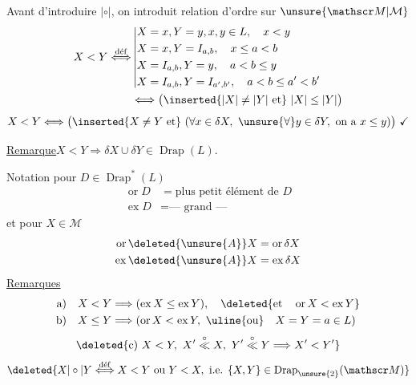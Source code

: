 
Avant d'introduire $|\circ|$, on introduit relation d'ordre sur $\unsure{\mathscr M|\mathcal M}$
\[
\begin{aligned}
X<Y\overset{\mathrm{d\acute ef}}{\Longleftrightarrow}
&\left\vert\begin{aligned}
&X=x,Y=y,x,y\in L,\quad x<y\\
&X=x,Y=I_{a,b},\quad x\leq a<b\\
&X=I_{a,b},Y=y,\quad a<b\leq y\\
&X=I_{a,b},Y=I_{a',b'},\quad a<b\leq a'<b'
\end{aligned}\right.\\
&\Longleftrightarrow\bigl(\inserted{|X|\ne|Y|\text{ et}}\ |X|\leq|Y|\bigr)
\end{aligned}
\]
\[
X<Y\Longleftrightarrow\bigl(\inserted{X\ne Y\text{ et}}\ (\forall x\in\delta X,\ \unsure{\forall}y\in\delta Y,\text{ on a }x\leq y)\bigr)\ \checkmark
\]

\uline{Remarque}\quad $X<Y\Longrightarrow\delta X\cup\delta Y\in\operatorname{Drap}(L)$.

Notation pour $D\in\operatorname{Drap}^*(L)$
\[
\begin{aligned}
\operatorname{or}D&=\text{plus petit élément de }D\\
\operatorname{ex}D&=\text{--- grand ---}
\end{aligned}
\]
et  pour $X\in\mathscr M$
\[
\begin{aligned}
\operatorname{or}\deleted{\unsure{A}}X&=\operatorname{or}\delta X\\
\operatorname{ex}\deleted{\unsure{A}}X&=\operatorname{ex}\delta X
\end{aligned}
\]
\uline{Remarques}
\[
\begin{aligned}
\text{a)}\quad X<Y&\Longrightarrow(\operatorname{ex}X\leq\operatorname{ex}Y),\quad\deleted{\text{et}\quad\operatorname{or}X<\operatorname{ex}Y}\\
\text{b)}\quad X\leq Y&\Longrightarrow(\operatorname{or}X<\operatorname{ex}Y,\ \text{\uline{ou}}\quad X=Y=a\in L)
\end{aligned}
\]
\[
\deleted{\text{c)}\ X<Y,\ X'\overset{\circ}{\ll}X,\ Y'\overset{\circ}{\ll}Y\Longrightarrow X'<Y'}
\]
\[
\deleted{X|\circ|Y\overset{\mathrm{d\acute ef}}{\Longleftrightarrow}X<Y\text{ ou }Y<X,\text{ i.e. }\{X,Y\}\in\operatorname{Drap}_{\unsure{2}}(\mathscr M)}
\]

